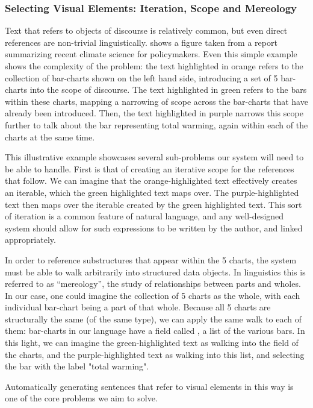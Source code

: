 \subsubsection{Selecting Visual Elements: Iteration, Scope and Mereology}
Text that refers to objects of discourse is relatively common, but even direct references are non-trivial 
linguistically.  shows a figure taken from a report summarizing recent climate 
science for policymakers. Even this simple example shows the complexity of the problem: the text highlighted
in orange refers to the collection of bar-charts shown on the left hand side, introducing a set of 5 bar-charts
into the scope of discourse. The text highlighted in green refers to the bars within these charts, mapping 
a narrowing of scope across the bar-charts that have already been introduced. Then, the text highlighted in
purple narrows this scope further to talk about the bar representing total warming, again within each of the
charts at the same time. 

This illustrative example showcases several sub-problems our system will need to be able to handle. First
is that of creating an iterative scope for the references that follow. We can imagine that the orange-highlighted
text effectively creates an iterable, which the green highlighted text maps over. The purple-highlighted text
then maps over the iterable created by the green highlighted text. This sort of iteration is a common feature of natural language,
and any well-designed system should allow for such expressions to be written by the author, and linked appropriately.

In order to reference substructures that appear within the 5 charts, the system must be able to walk arbitrarily 
into structured data objects. In linguistics this is referred to as ``mereology'', the study of relationships
between parts and wholes. In our case, one could imagine the collection of 5 charts as the whole, with each
individual bar-chart being a part of that whole. Because all 5 charts are structurally the same (of the same type),
we can apply the same walk to each of them: bar-charts in our language have a field called , a list
of the various bars. In this light, we can imagine the green-highlighted text as walking into the  field
of the charts, and the purple-highlighted text as walking into this list, and selecting the bar with the label "total warming".

Automatically generating sentences that refer to visual elements in this way is one of the core problems we aim to solve.

